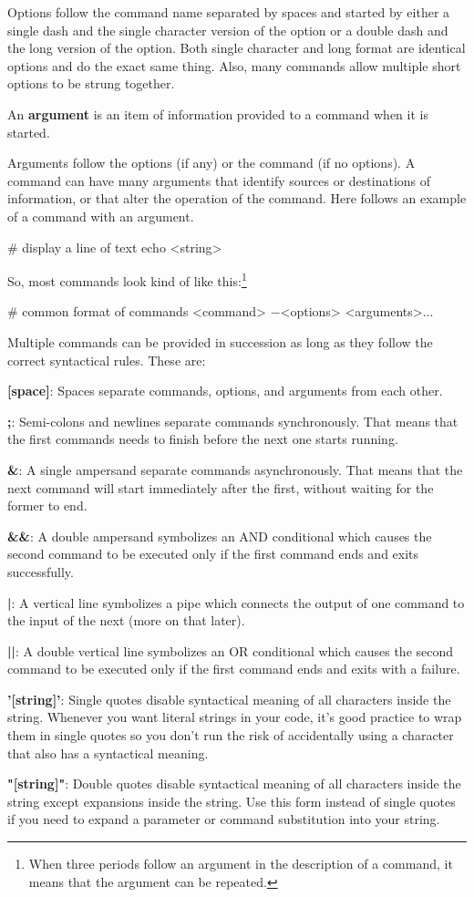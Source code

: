 Options follow the command name separated by spaces and started by either a single dash \code{-} and the single
character version of the option or a double dash \code{--} and the long version of the option. Both single character
and long format are identical options and do the exact same thing. Also, many commands allow multiple short options to
be strung together.

\bd[Argument]
An \textbf{argument} is an item of information provided to a command when it is started.
\ed

Arguments follow the options (if any) or the command (if no options). A command can have many arguments that identify
sources or destinations of information, or that alter the operation of the command. Here follows an example of a command
with an argument.

\be
\begin{bash}
# display a line of text
echo <string>
\end{bash}
\ee

So, most commands look kind of like this:\footnote{When three periods follow an argument in the description of a
command, it means that the argument can be repeated.}
\begin{bash}
# common format of commands
<command> $-$<options> <arguments>...
\end{bash}

Multiple commands can be provided in succession as long as they follow the correct syntactical rules. These are:
\bit
\item \textbf{[space]}: Spaces separate commands, options, and arguments from each other.
\item \textbf{;}: Semi-colons and newlines separate commands synchronously. That means that the first commands needs to
finish before the next one starts running.
\item \textbf{\&}: A single ampersand separate commands asynchronously. That means that the next command will start
immediately after the first, without waiting for the former to end.
\item \textbf{\&\&}: A double ampersand symbolizes an AND conditional which causes the second command to be executed only
if the first command ends and exits successfully.
\item \textbf{|}: A vertical line symbolizes a pipe which connects the output of one command to the input of the next
(more on that later).
\item \textbf{||}: A double vertical line symbolizes an OR conditional which causes the second command to be executed
only if the first command ends and exits with a failure.
\item \textbf{'[string]'}: Single quotes disable syntactical meaning of all characters inside the string. Whenever you
want literal strings in your code, it's good practice to wrap them in single quotes so you don't run the risk of
accidentally using a character that also has a syntactical meaning.
\item \textbf{"[string]"}: Double quotes disable syntactical meaning of all characters inside the string except
expansions inside the string. Use this form instead of single quotes if you need to expand a parameter or command
substitution into your string.
\eit

